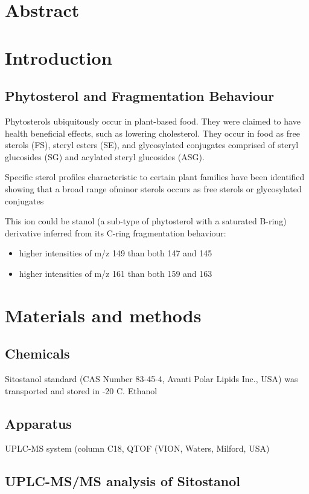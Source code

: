 \section{Abstract}

\section{Introduction}
\subsection{Phytosterol and Fragmentation Behaviour}
Phytosterols ubiquitously occur in plant-based food\cite{sterolmsms}. They were claimed to have health beneficial effects, such as lowering cholesterol. They occur in food as free sterols (FS), steryl esters (SE), and glycosylated conjugates comprised of steryl glucosides (SG) and acylated steryl glucosides (ASG).

Specific sterol profiles characteristic to certain plant families have been identified showing that a broad range ofminor sterols occurs as free sterols or glycosylated conjugates

This ion could be stanol (a sub-type of phytosterol with a saturated B-ring) derivative inferred from its C-ring fragmentation behaviour: 
\begin{itemize}
	\item higher intensities of m/z 149 than both 147 and 145
	\item higher intensities of m/z 161 than both 159 and 163
\end{itemize}
 


\section{Materials and methods}
\subsection{Chemicals}
Sitostanol standard (CAS Number 83-45-4, Avanti Polar Lipids Inc., USA) was transported and stored in -20 \degree C. Ethanol

\subsection{Apparatus}
UPLC-MS system (column C18, QTOF (VION, Waters, Milford, USA)

\subsection{UPLC-MS/MS analysis of Sitostanol}

